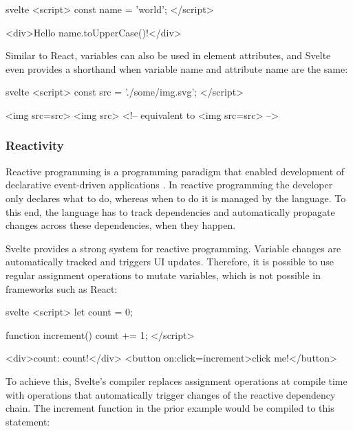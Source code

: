
\begin{myminted}{svelte}{}
<script>
  const name = 'world';
</script>

<div>Hello {name.toUpperCase()}!</div>
\end{myminted}

Similar to React, variables can also be used in element attributes, and Svelte even provides a shorthand when variable name and attribute name are the same:
\begin{myminted}{svelte}{}
<script>
  const src = './some/img.svg';
</script>

<img src={src}>
<img {src}> <!-- equivalent to <img src={src}> -->
\end{myminted}

\subsubsection{Reactivity}
\label{sec:svelte-reactivity}

Reactive programming is a programming paradigm that enabled development of declarative event-driven applications \cite{bainomugisha_survey_2013}. In reactive programming the developer only declares what to do, whereas when to do it is managed by the language. To this end, the language has to track dependencies and automatically propagate changes across these dependencies, when they happen.

Svelte provides a strong system for reactive programming. Variable changes are automatically tracked and triggers UI updates. Therefore, it is possible to use regular assignment operations to mutate variables, which is not possible in frameworks such as React:

\begin{myminted}{svelte}{}
<script>
  let count = 0;

  function increment() {
    count += 1;
  }
</script>

<div>count: {count}!</div>
<button on:click={increment}>click me!</button>
\end{myminted}

To achieve this, Svelte's compiler replaces assignment operations at compile time with operations that automatically trigger changes of the reactive dependency chain. The increment function in the prior example would be compiled to this statement:

